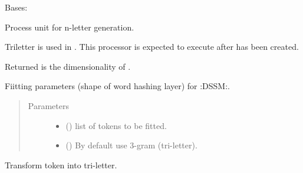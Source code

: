 \documentclass[letterpaper,10pt,english]{sphinxmanual}
\begin{document}
\begin{fulllineitems}
\label{\detokenize{matchzoo:matchzoo.preprocessors.NgramLetterUnit}}
Bases: {\hyperref[\detokenize{matchzoo:matchzoo.preprocessors.StatefulProcessorUnit}]{}}

Process unit for n-letter generation.

Triletter is used in .
This processor is expected to execute after 
has been created.

Returned  is the dimensionality of .

\begin{fulllineitems}
\label{\detokenize{matchzoo:matchzoo.preprocessors.NgramLetterUnit.fit}}
Fiitting parameters (shape of word hashing layer) for :DSSM:.
\begin{quote}\begin{description}
\item[{Parameters}] \leavevmode\begin{itemize}
\item {} 
 () \textendash{} list of tokens to be fitted.

\item {} 
 () \textendash{} By default use 3-gram (tri-letter).

\end{itemize}

\end{description}\end{quote}

\end{fulllineitems}


\begin{fulllineitems}
\label{\detokenize{matchzoo:matchzoo.preprocessors.NgramLetterUnit.transform}}
Transform token into tri-letter.


\end{fulllineitems}
\end{fulllineitems}
\end{document}
